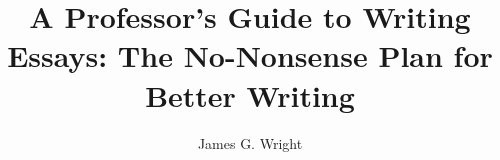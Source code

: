 \documentclass[10pt,a4paper]{article}
\begin{document}
\title{A Professor's Guide to Writing Essays: The No-Nonsense Plan for Better Writing\cite{neumann2016professor}}
\author{James G. Wright }
\maketitle



\end{document}

